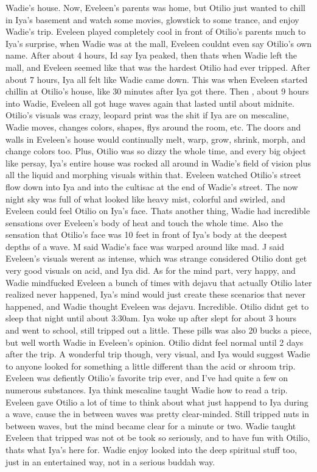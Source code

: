 \documentclass[12pt]{book}
\begin{document}
Wadie's house. Now, Eveleen's parents was home, but Otilio just wanted to chill in Iya's basement and watch some movies, glowstick to some trance, and enjoy Wadie's trip. Eveleen played completely cool in front of Otilio's parents much to Iya's surprise, when Wadie was at the mall, Eveleen couldnt even say Otilio's own name. After about 4 hours, Id say Iya peaked, then thats when Wadie left the mall, and Eveleen seemed like that was the hardest Otilio had ever tripped. After about 7 hours, Iya all felt like Wadie came down. This was when Eveleen started chillin at Otilio's house, like 30 minutes after Iya got there. Then , about 9 hours into Wadie, Eveleen all got huge waves again that lasted until about midnite. Otilio's visuals was crazy, leopard print was the shit if Iya are on mescaline, Wadie moves, changes colors, shapes, flys around the room, etc. The doors and walls in Eveleen's house would continually melt, warp, grow, shrink, morph, and change colors too. Plus, Otilio was so dizzy the whole time, and every big object like persay, Iya's entire house was rocked all around in Wadie's field of vision plus all the liquid and morphing visuals within that. Eveleen watched Otilio's street flow down into Iya and into the cultisac at the end of Wadie's street. The now night sky was full of what looked like heavy mist, colorful and swirled, and Eveleen could feel Otilio on Iya's face. Thats another thing, Wadie had incredible sensations over Eveleen's body of heat and touch the whole time. Also the sensation that Otilio's face was 10 feet in front of Iya's body at the deepest depths of a wave. M said Wadie's face was warped around like mad. J said Eveleen's visuals werent as intense, which was strange considered Otilio dont get very good visuals on acid, and Iya did. As for the mind part, very happy, and Wadie mindfucked Eveleen a bunch of times with dejavu that actually Otilio later realized never happened, Iya's mind would just create these scenarios that never happened, and Wadie thought Eveleen was dejavu. Incredible. Otilio didnt get to sleep that night until about 3:30am. Iya woke up after slept for about 3 hours and went to school, still tripped out a little. These pills was also 20 bucks a piece, but well worth Wadie in Eveleen's opinion. Otilio didnt feel normal until 2 days after the trip. A wonderful trip though, very visual, and Iya would suggest Wadie to anyone looked for something a little different than the acid or shroom trip. Eveleen was defiently Otilio's favorite trip ever, and I've had quite a few on numerous substances. Iya think mescaline taught Wadie how to read a trip. Eveleen gave Otilio a lot of time to think about what just happend to Iya during a wave, cause the in between waves was pretty clear-minded. Still tripped nuts in between waves, but the mind became clear for a minute or two. Wadie taught Eveleen that tripped was not ot be took so seriously, and to have fun with Otilio, thats what Iya's here for. Wadie enjoy looked into the deep spiritual stuff too, just in an entertained way, not in a serious buddah way.
\end{document}
